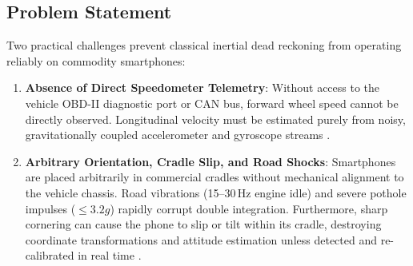 \documentclass[conference]{IEEEtran}
\begin{document}
\subsection{Problem Statement}
Two practical challenges prevent classical inertial dead reckoning from operating reliably on commodity smartphones:
\begin{enumerate}
\item \textbf{Absence of Direct Speedometer Telemetry}: Without access to the vehicle OBD-II diagnostic port or CAN bus, forward wheel speed cannot be directly observed. Longitudinal velocity must be estimated purely from noisy, gravitationally coupled accelerometer and gyroscope streams \cite{brossard2020, qian2025}.
\item \textbf{Arbitrary Orientation, Cradle Slip, and Road Shocks}: Smartphones are placed arbitrarily in commercial cradles without mechanical alignment to the vehicle chassis. Road vibrations (15--30\,Hz engine idle) and severe pothole impulses ($\le 3.2g$) rapidly corrupt double integration. Furthermore, sharp cornering can cause the phone to slip or tilt within its cradle, destroying coordinate transformations and attitude estimation unless detected and re-calibrated in real time \cite{matos2025}.
\end{enumerate}
\end{document}
